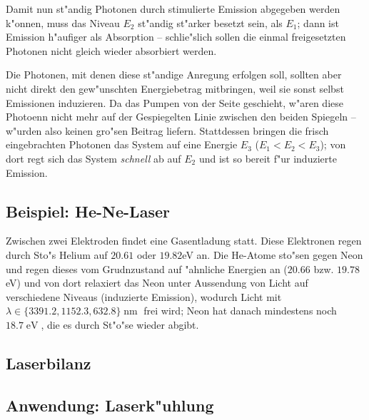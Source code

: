 \documentclass[a4paper,draft]{article}
\begin{document}
Damit nun st"andig Photonen durch stimulierte Emission abgegeben
werden k"onnen, muss das Niveau $E_2$ st"andig st"arker besetzt sein,
als $E_1$; dann ist Emission h"aufiger als Absorption -- schlie"slich
sollen die einmal freigesetzten Photonen nicht gleich wieder
absorbiert werden.

Die Photonen, mit denen diese st"andige Anregung erfolgen soll,
sollten aber nicht direkt den gew"unschten Energiebetrag mitbringen,
weil sie sonst selbst Emissionen induzieren. Da das Pumpen von der
Seite geschieht, w"aren diese Photoenn nicht mehr auf der Gespiegelten
Linie zwischen den beiden Spiegeln -- w"urden also keinen gro"sen
Beitrag liefern. Stattdessen bringen die frisch eingebrachten Photonen
das System auf eine Energie $E_3$ ($E_1 < E_2 < E_3$); von dort regt
sich das System \emph{schnell} ab auf $E_2$ und ist so bereit f"ur
induzierte Emission.




\subsection{Beispiel: He-Ne-Laser}
\label{sec:he_ne_laser}

Zwischen zwei Elektroden findet eine Gasentladung statt. Diese
Elektronen regen durch Sto"s Helium auf $20.61$ oder $19.82$eV an. Die
He-Atome sto"sen gegen Neon und regen dieses vom Grudnzustand auf
"ahnliche Energien an ($20.66$ bzw. $19.78$eV) und von dort relaxiert
das Neon unter Aussendung von Licht auf verschiedene Niveaus
(induzierte Emission), wodurch Licht mit $\lambda \in \{ 3391.2,
1152.3, 632.8 \}\operatorname{nm}$ frei wird; Neon hat danach
mindestens noch $18.7\operatorname{eV}$, die es durch St"o"se wieder
abgibt.






\subsection{Laserbilanz}
\label{sec:laserbilanz}
















\subsection{Anwendung: Laserk"uhlung}
\label{sec:laserkuhlung}






























\end{document}

